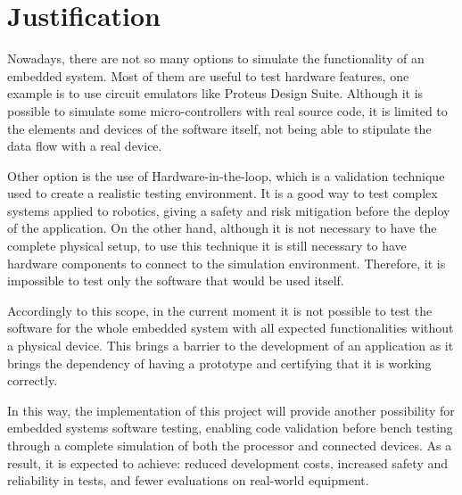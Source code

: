 \documentclass[../../monografia.tex]{subfiles}
\begin{document}
\section{Justification}

Nowadays, there are not so many options to simulate the functionality of an embedded system. Most of them are useful to test hardware features, one example is to use circuit emulators like Proteus Design Suite. Although it is possible to simulate some micro-controllers with real source code, it is limited to the  elements and devices of the software itself, not being able to stipulate the data flow with a real device.

Other option is the use of Hardware-in-the-loop, which is a validation technique used to create a realistic testing environment. It is a good way to test complex systems applied to robotics, giving a safety and risk mitigation before the deploy of the application. On the other hand, although it is not necessary to have the complete physical setup, to use this technique it is still necessary to have hardware components to connect to the simulation environment. Therefore, it is impossible to test only the software that would be used itself.

Accordingly to this scope, in the current moment it is not possible to test the software for the whole embedded system with all expected functionalities without a physical device. This brings a barrier to the development of an application as it brings the dependency of having a prototype and certifying that it is working correctly.

In this way, the implementation of this project will provide another possibility for embedded systems software testing, enabling code validation before bench testing through a complete simulation of both the processor and connected devices. As a result, it is expected to achieve: reduced development costs, increased safety and reliability in tests, and fewer evaluations on real-world equipment.
 
\end{document}
